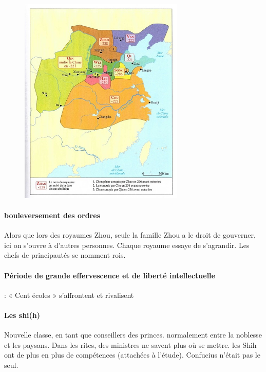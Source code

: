  \begin{figure}[!h]
     \centering
     \includegraphics[width=0.7\textwidth]{ConfucianismeTaoismeBouddhismeChinois/Images/CarteEtatsIndependants.jpg}

     \label{fig:enter-label}
 \end{figure}




\paragraph{bouleversement des ordres}
Alors que lors des royaumes Zhou, seule la famille Zhou a le droit de gouverner, ici on s'ouvre à d'autres personnes. Chaque royaume essaye de s'agrandir.  Les chefs de principautés se nomment rois. 

 

\paragraph{Période de grande effervescence et de liberté intellectuelle}  : « Cent
écoles » s’affrontent et rivalisent

\paragraph{Les shi(h)} Nouvelle classe, en tant que conseillers
des princes. normalement entre la noblesse et les paysans. Dans les rites, des ministres ne savent plus où se mettre. les Shih ont de plus en plus de compétences (attachées à l'étude). Confucius n'était pas le seul.
 


